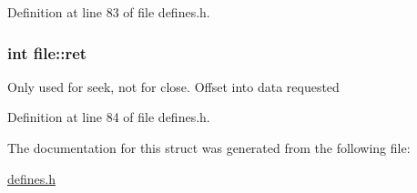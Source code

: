 Definition at line 83 of file defines.\-h.

\hypertarget{structfile_a6d285b7a32eb853a1dcb00014942d8ae}{
\subsubsection[{ret}]{\setlength{\rightskip}{0pt plus 5cm}int file\-::ret}}\label{structfile_a6d285b7a32eb853a1dcb00014942d8ae}
Only used for seek, not for close. Offset into data requested 

Definition at line 84 of file defines.\-h.



The documentation for this struct was generated from the following file\-:\begin{DoxyCompactItemize}
\item 
\hyperlink{defines_8h}{defines.\-h}\end{DoxyCompactItemize}
